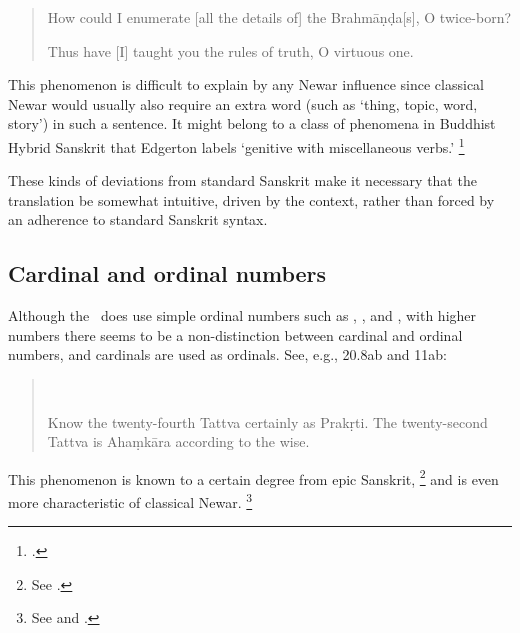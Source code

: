 \begin{quote}


How could I enumerate [all the details of] the Brahmāṇḍa[s], O twice-born?


Thus have [I] taught you the rules of truth, O virtuous one.

\end{quote}

\noindent
This phenomenon is difficult to explain by any Newar influence since
classical Newar would usually also require an 
extra word (such as  `thing, topic, word, story') in such a sentence.
It might belong to a class of phenomena in Buddhist Hybrid Sanskrit 
that Edgerton labels `genitive with miscellaneous verbs.'%
		\footnote{.}

These kinds of deviations from standard Sanskrit make it
necessary that the translation be somewhat intuitive,
driven by the context, rather than forced by an adherence to
standard Sanskrit syntax.





\subsection{Cardinal and ordinal numbers}

Although the \VSS\ does use simple ordinal numbers such 
as , , and , with higher 
numbers there seems to be a non-distinction between cardinal
and ordinal numbers, and cardinals are used as ordinals.
See, e.g., 20.8ab and 11ab:

\begin{quote}
\\

Know the twenty-fourth Tattva certainly as Prakṛti.
The twenty-second Tattva is Ahaṃkāra according to the wise.
\end{quote}

\noindent
This phenomenon is known to a certain degree
from epic Sanskrit,%
	\footnote{See .}
and is even more characteristic of classical Newar.%
		\footnote{See  and
									 .}





